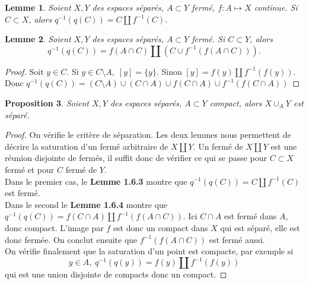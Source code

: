 \documentclass[12pt]{book}
\newtheorem{lemma}{Lemme}[section]
\newtheorem{prop}[lemma]{Proposition}
\theoremstyle{definition}
\theoremstyle{remark}
\begin{document}
	\begin{lemma}
		Soient $X,Y$ des espaces séparés, $A\subset Y$ fermé, $f : A \longmapsto X$ continue. Si $C \subset X$, alors $q^{-1}(q(C)) = C \amalg f^{-1}(C)$. 
	\end{lemma}
	\begin{lemma}
		Soient $X,Y$ des espaces séparés,  $A\subset Y$ fermé. Si $C \subset Y$, alors \[q^{-1}(q(C)) = f(A\cap C) \amalg (C \cup f^{-1}(f(A\cap C))).\]
	\end{lemma}
	\begin{proof}
		Soit $y \in C$. Si $y\in C \setminus A, \; [y] = \{y\}$. Sinon $[y] = f(y) \amalg f^{-1}(f(y))$. Donc $q^{-1}(q(C)) = (C\setminus A) \cup (C \cap A) \cup f(C\cap A) \cup f^{-1}(f(C\cap A))$ 	
	\end{proof}
	\begin{prop}
		Soient $X,Y$ des espaces séparés,  $A\subset Y$ compact, alors $X \cup_A Y$ est séparé.
	\end{prop}
	\begin{proof}
		On vérifie le critère de séparation. Les deux lemmes nous permettent de décrire la saturation d'un fermé arbitraire de $X \coprod Y$. Un fermé de  $X \coprod Y$ est une réunion disjointe de fermés, il suffit donc de vérifier ce qui se passe pour $C \subset X$ fermé et pour $C$ fermé de  $Y$.\\ 
		Dans le premier cas, le \textbf{Lemme 1.6.3} montre que $q^{-1}(q(C)) = C \amalg f^{-1}(C)$ est fermé. \\
		Dans le second le \textbf{Lemme 1.6.4} montre que $q^{-1}(q(C)) =f(C\cap A) \amalg f^{-1}(f(A\cap C))$. Ici $C\cap A$ est fermé dans $A$, donc compact. L'image par $f$ est donc un compact dans $X$ qui est séparé, elle est donc fermée. On conclut ensuite que $f^{-1}(f(A\cap C))$ est fermé aussi. \\ 
	On vérifie finalement que la saturation d'un point est compacte, par exemple si \[y \in A, \; q^{-1}(q(y)) = f(y) \amalg f^{-1}(f(y))\] qui est une union disjointe de compacts donc un compact.
	\end{proof}
	
\end{document}
